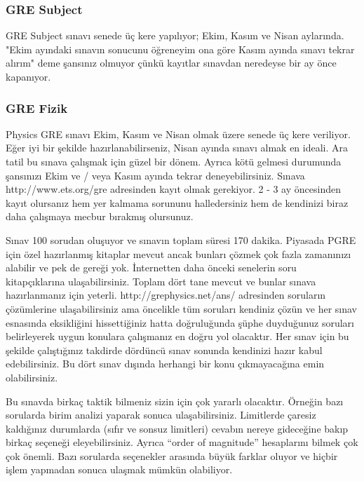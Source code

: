 \documentclass[12pt]{article}
\begin{document}
\subsubsection{GRE Subject}
GRE Subject sınavı senede üç kere yapılıyor; Ekim, Kasım ve Nisan aylarında. "Ekim ayındaki sınavın sonucunu öğreneyim ona göre Kasım ayında sınavı tekrar alırım" deme şansınız olmuyor çünkü kayıtlar sınavdan neredeyse bir ay önce kapanıyor.

\subsubsection{GRE Fizik}
Physics GRE sınavı Ekim, Kasım ve Nisan olmak üzere senede üç kere veriliyor. Eğer iyi bir şekilde hazırlanabilirseniz, Nisan ayında sınavı almak en ideali. Ara tatil bu sınava çalışmak için güzel bir dönem. Ayrıca kötü gelmesi durumunda şansınızı Ekim ve / veya Kasım ayında tekrar deneyebilirsiniz. Sınava http://www.ets.org/gre adresinden kayıt olmak gerekiyor. 2 - 3 ay öncesinden kayıt olursanız hem yer kalmama sorununu halledersiniz hem de kendinizi biraz daha çalışmaya mecbur bırakmış olursunuz. 

Sınav 100 sorudan oluşuyor ve sınavın toplam süresi 170 dakika. Piyasada PGRE için özel hazırlanmış kitaplar mevcut ancak bunları çözmek çok fazla zamanınızı alabilir ve pek de gereği yok. İnternetten daha önceki senelerin soru kitapçıklarına ulaşabilirsiniz. Toplam dört tane mevcut ve bunlar sınava hazırlanmanız için yeterli. http://grephysics.net/ans/ adresinden soruların çözümlerine ulaşabilirsiniz ama öncelikle tüm soruları kendiniz çözün ve her sınav esnasında eksikliğini hissettiğiniz hatta doğruluğunda şüphe duyduğunuz soruları belirleyerek uygun konulara çalışmanız en doğru yol olacaktır. Her sınav için bu şekilde çalıştığınız takdirde dördüncü sınav sonunda kendinizi hazır kabul edebilirsiniz. Bu dört sınav dışında herhangi bir konu çıkmayacağına emin olabilirsiniz. 

Bu sınavda birkaç taktik bilmeniz sizin için çok yararlı olacaktır. Örneğin bazı sorularda birim analizi yaparak sonuca ulaşabilirsiniz. Limitlerde çaresiz kaldığınız durumlarda (sıfır ve sonsuz limitleri) cevabın nereye gideceğine bakıp birkaç seçeneği eleyebilirsiniz. Ayrıca “order of magnitude” hesaplarını bilmek çok çok önemli. Bazı sorularda seçenekler arasında büyük farklar oluyor ve hiçbir işlem yapmadan sonuca ulaşmak mümkün olabiliyor. 
\end{document}
